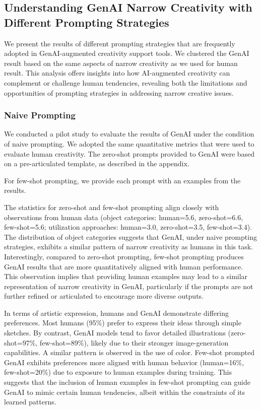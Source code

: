 \subsection{Understanding GenAI Narrow Creativity with Different Prompting Strategies}

We present the results of different prompting strategies that are frequently adopted in GenAI-augmented creativity support tools.
We clustered the GenAI result based on the same aspects of narrow creativity as we used for human result.
This analysis offers insights into how AI-augmented creativity can complement or challenge human tendencies, revealing both the limitations and opportunities of prompting strategies in addressing narrow creative issues.

\subsubsection{Naive Prompting}

We conducted a pilot study to evaluate the results of GenAI under the condition of naive prompting.
We adopted the same quantitative metrics that were used to evaluate human creativity.
The zero-shot prompts provided to GenAI were based on a pre-articulated template, as described in the appendix.

For few-shot prompting, we provide each prompt with an examples from the results.

The statistics for zero-shot and few-shot prompting align closely with observations from human data (object categories: human=5.6, zero-shot=6.6, few-shot=5.6; utilization approaches: human=3.0, zero-shot=3.5, few-shot=3.4). 
The distribution of object categories suggests that GenAI, under naive prompting strategies, exhibits a similar pattern of narrow creativity as humans in this task. Interestingly, compared to zero-shot prompting, few-shot prompting produces GenAI results that are more quantitatively aligned with human performance. This observation implies that providing human examples may lead to a similar representation of narrow creativity in GenAI, particularly if the prompts are not further refined or articulated to encourage more diverse outputs.


In terms of artistic expression, humans and GenAI demonstrate differing preferences. Most humans (95\%) prefer to express their ideas through simple sketches. By contrast, GenAI models tend to favor detailed illustrations (zero-shot=97\%, few-shot=89\%), likely due to their stronger image-generation capabilities.
A similar pattern is observed in the use of color. Few-shot prompted GenAI exhibits preferences more aligned with human behavior (human=16\%, few-shot=20\%) due to exposure to human examples during training. This suggests that the inclusion of human examples in few-shot prompting can guide GenAI to mimic certain human tendencies, albeit within the constraints of its learned patterns.


